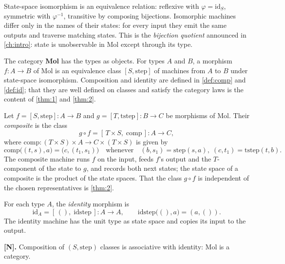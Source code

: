 \begin{remark}
State-space isomorphism is an equivalence relation: reflexive with
$\varphi = \mathrm{id}_S$, symmetric with $\varphi^{-1}$, transitive by
composing bijections. Isomorphic machines differ only in the names of their
states: for every input they emit the same outputs and traverse matching
states. This is the \emph{bijection quotient} announced in
\autoref{ch:intro}: state is unobservable in Mol except through its type.
\end{remark}

\begin{definition}\label{def:mol}
The category \textbf{Mol} has the types as objects. For types $A$ and $B$, a
morphism $f : A \to B$ of Mol is an equivalence class $[S, \mathrm{step}]$ of
machines from $A$ to $B$ under state-space isomorphism. Composition and
identity are defined in \autoref{def:comp} and \autoref{def:id}; that they
are well defined on classes and satisfy the category laws is the content of
\autoref{thm:1} and \autoref{thm:2}.
\end{definition}

\begin{definition}[Composition]\label{def:comp}
Let $f = [S, \mathrm{step}] : A \to B$ and $g = [T, \mathrm{tstep}] : B \to C$
be morphisms of Mol. Their \emph{composite} is the class
\[ g \circ f = [\, T \times S,\; \mathrm{comp} \,] : A \to C , \]
where $\mathrm{comp} : (T \times S) \times A \to C \times (T \times S)$ is given
by
\[ \mathrm{comp}\bigl ((t, s), a\bigr) = \bigl (c, (t_1, s_1)\bigr)
   \quad\text{whenever}\quad (b, s_1) = \mathrm{step} (s, a),\; (c, t_1)
   = \mathrm{tstep} (t, b) . \]
The composite machine runs $f$ on the input, feeds $f$'s output and the
$T$-component of the state to $g$, and records both next states; the state
space of a composite is the product of the state spaces. That the class
$g \circ f$ is independent of the chosen representatives is \autoref{thm:2}.
\end{definition}

\begin{definition}[Identity]\label{def:id}
For each type $A$, the \emph{identity} morphism is
\[ \mathrm{id}_A = [\, (),\; \mathrm{idstep} \,] : A \to A ,
   \qquad \mathrm{idstep}\bigl ((), a\bigr) = (a, ()) . \]
The identity machine has the unit type as state space and copies its input to
the output.
\end{definition}

\begin{theorem}\label{thm:1}
\textbf{[N].} Composition of $(S, \mathrm{step})$ classes is associative with
identity: Mol is a category.
\end{theorem}


